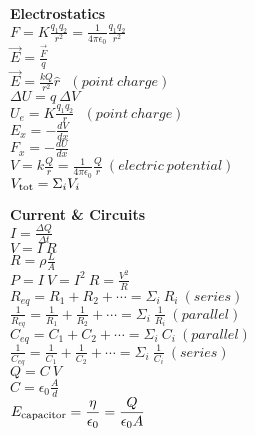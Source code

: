 \documentclass[12pt]{article}
\begin{document}
\begin{twocolumn}
\begin{flushleft}
\bigskip
{\bf Electrostatics}\\
\bigskip
$\displaystyle F = K \frac{q_1 q_2}{r^2} = \frac{1}{4 \pi \epsilon_0} \frac{q_1 q_2}{r^2} $ \\
\medskip
$\displaystyle \vec{E} = \frac{\vec{F}}{q}$ \\
\medskip
$\displaystyle \vec{E} = \frac{k Q}{r^2}\hat{r} ~~~(point\  charge)$ \\
\medskip
$\displaystyle \Delta U = q~\Delta V $ \\
\medskip
$\displaystyle U_e = K\frac{q_1 q_2}{r} \ ~~(point \ charge)$\\ 
\medskip
$E_{x} = -\frac{d V}{dx}$ \\
\medskip
$F_{x} = -\frac{d U}{dx}$ \\
\medskip
$\displaystyle V = k \frac{Q}{r} = \frac{1}{4 \pi
  \epsilon_0}\frac{Q}{r}  \ (electric \ potential)$\\
\medskip
$\displaystyle V_{\rm tot} = \Sigma_{i} V_{i}$ \\
\bigskip

{\bf Current \& Circuits} \\
\bigskip
$\displaystyle I = \frac{\Delta Q}{\Delta t}$ \\
\medskip
$\displaystyle V = I~ R$ \\
\medskip
$\displaystyle R = \rho \frac{L}{A}$ \\
\medskip
$\displaystyle P = I~V = I^2~ R = \frac{V^2}{R}$ \\
\medskip
$\displaystyle R_{eq} = R_1 + R_2 + \cdots = \Sigma_i~ R_i ~ (series) $\\
\medskip
$\displaystyle \frac{1}{R_{eq}} = \frac{1}{R_1} + \frac{1}{R_2} +
\cdots = \Sigma_i ~ \frac{1}{R_i} ~ (parallel)$ \\ 
\medskip
$\displaystyle C_{eq} = C_1 + C_2 + \cdots = \Sigma_i~ C_i ~(parallel) $\\
\medskip
$\displaystyle \frac{1}{C_{eq}} = \frac{1}{C_1} + \frac{1}{C_2} +
\cdots = \Sigma_i ~ \frac{1}{C_i} ~ (series)$ \\ 
\medskip
$\displaystyle Q = C ~ V$ \\
\medskip
$\displaystyle C = \epsilon_0 \frac{A}{d}$ \\
\medskip
 $\displaystyle E_{\rm capacitor} =  \frac{\eta}{\epsilon_0} =
 \frac{Q}{\epsilon_0A} $ 


\end{flushleft}
\end{twocolumn}
\end{document}
